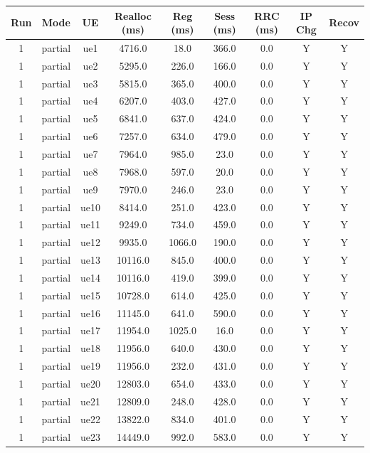 \begin{table}[ht]
\centering
\begin{tabular}{|c|c|c|c|c|c|c|c|c|}
\hline
Run & Mode & UE & Realloc (ms) & Reg (ms) & Sess (ms) & RRC (ms) & IP Chg & Recov \\
\hline
1 & partial & ue1 & 4716.0 & 18.0 & 366.0 & 0.0 & Y & Y \\
1 & partial & ue2 & 5295.0 & 226.0 & 166.0 & 0.0 & Y & Y \\
1 & partial & ue3 & 5815.0 & 365.0 & 400.0 & 0.0 & Y & Y \\
1 & partial & ue4 & 6207.0 & 403.0 & 427.0 & 0.0 & Y & Y \\
1 & partial & ue5 & 6841.0 & 637.0 & 424.0 & 0.0 & Y & Y \\
1 & partial & ue6 & 7257.0 & 634.0 & 479.0 & 0.0 & Y & Y \\
1 & partial & ue7 & 7964.0 & 985.0 & 23.0 & 0.0 & Y & Y \\
1 & partial & ue8 & 7968.0 & 597.0 & 20.0 & 0.0 & Y & Y \\
1 & partial & ue9 & 7970.0 & 246.0 & 23.0 & 0.0 & Y & Y \\
1 & partial & ue10 & 8414.0 & 251.0 & 423.0 & 0.0 & Y & Y \\
1 & partial & ue11 & 9249.0 & 734.0 & 459.0 & 0.0 & Y & Y \\
1 & partial & ue12 & 9935.0 & 1066.0 & 190.0 & 0.0 & Y & Y \\
1 & partial & ue13 & 10116.0 & 845.0 & 400.0 & 0.0 & Y & Y \\
1 & partial & ue14 & 10116.0 & 419.0 & 399.0 & 0.0 & Y & Y \\
1 & partial & ue15 & 10728.0 & 614.0 & 425.0 & 0.0 & Y & Y \\
1 & partial & ue16 & 11145.0 & 641.0 & 590.0 & 0.0 & Y & Y \\
1 & partial & ue17 & 11954.0 & 1025.0 & 16.0 & 0.0 & Y & Y \\
1 & partial & ue18 & 11956.0 & 640.0 & 430.0 & 0.0 & Y & Y \\
1 & partial & ue19 & 11956.0 & 232.0 & 431.0 & 0.0 & Y & Y \\
1 & partial & ue20 & 12803.0 & 654.0 & 433.0 & 0.0 & Y & Y \\
1 & partial & ue21 & 12809.0 & 248.0 & 428.0 & 0.0 & Y & Y \\
1 & partial & ue22 & 13822.0 & 834.0 & 401.0 & 0.0 & Y & Y \\
1 & partial & ue23 & 14449.0 & 992.0 & 583.0 & 0.0 & Y & Y \\

\end{tabular}
\end{table}
